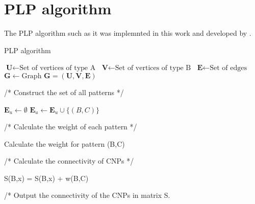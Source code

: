 \chapter{PLP algorithm}\label{ap:plp}
The PLP algorithm such as it was implemnted in this work and developed by \citet{plp}.


\makeatletter
\def\BState{\State\hskip-\ALG@thistlm}
\makeatother

\begin{algorithm}
\caption{PLP algorithm}

\begin{algorithmic}

\State $ \textbf{U} \gets \text{Set of vertices of type A}$
\State $ \textbf{V} \gets \text{Set of vertices of type B}$
\State $ \textbf{E} \gets \text{Set of edges}$
\State $ \textbf{G} \gets \text{Graph }\textbf{G}=(\textbf{U},\textbf{V},\textbf{E})$

\State /* Construct the set of all patterns */

\State $ \textbf{E}_u \gets \emptyset$
            \State $\textbf{E}_u \gets \textbf{E}_u \cup \{(B,C)\}$
        \EndFor
    \EndFor
\EndFor

\State /* Calculate the weight of each pattern */

    \State Calculate the weight for pattern (B,C)
\EndFor

\State /* Calculate the connectivity of CNPs */

                \State S(B,x) = S(B,x) + w(B,C)
            \EndIf
        \EndFor
    \EndFor
\EndFor

\State /* Output the connectivity of the CNPs in matrix S.

\end{algorithmic}
\end{algorithm}
